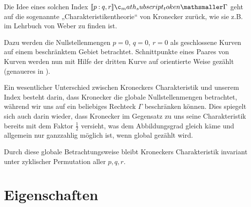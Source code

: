 \documentclass{mythesis}
\begin{document}
\begin{note}
    Die Idee eines solchen Index $\Index{\Gamma}{p}{q,r}$ geht auf die sogenannte „Charakteristikentheorie“ von Kronecker zurück, wie sie z.B. im Lehrbuch von Weber \cite[§93-95]{weber1895lehrbuch} zu finden ist.

    Dazu werden die Nullstellenmengen $p = 0$, $q = 0$, $r = 0$ als geschlossene Kurven auf einem beschränktem Gebiet betrachtet.
    Schnittpunkte eines Paares von Kurven werden nun mit Hilfe der dritten Kurve auf orientierte Weise gezählt (genaueres in \cite[§94]{weber1895lehrbuch}).

    Ein wesentlicher Unterschied zwischen Kroneckers Charakteristik und unserem Index besteht darin, dass Kronecker die globale Nullstellenmengen betrachtet, während wir uns auf ein beliebiges Rechteck $\Gamma$ beschränken können.
    Dies spiegelt sich auch darin wieder, dass Kronecker im Gegensatz zu uns seine Charakteristik bereits mit dem Faktor $\frac{1}{2}$ versieht, was dem Abbildungsgrad gleich käme und allgemein nur ganzzahlig möglich ist, wenn global gezählt wird.

    Durch diese globale Betrachtungsweise bleibt Kroneckers Charakteristik invariant unter zyklischer Permutation aller $p, q, r$.
\end{note}

\section{Eigenschaften}
\end{document}
